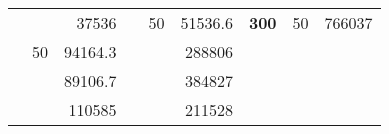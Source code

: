 \begin{table}[H]
\begin{tabular}{|ccrccrccc}
\rowcolor[HTML]{DDFDFF} 
\multicolumn{1}{|c|}{\cellcolor[HTML]{FFFFC7}}                                & \multicolumn{1}{c|}{\cellcolor[HTML]{DDFDFF}}                      & \multicolumn{1}{r|}{\cellcolor[HTML]{DAE8FC}37536}     & \multicolumn{1}{c|}{\cellcolor[HTML]{FFFFC7}}                                & \multicolumn{1}{c|}{\multirow{-10}{*}{\cellcolor[HTML]{DDFDFF}50}}  & \multicolumn{1}{r|}{\cellcolor[HTML]{DDFDFF}51536.6}   & \multicolumn{1}{c|}{\multirow{-19}{*}{\cellcolor[HTML]{FFFFC7}\textbf{300}}} & \multicolumn{1}{c|}{\multirow{-10}{*}{\cellcolor[HTML]{DDFDFF}50}} & \multicolumn{1}{r|}{\cellcolor[HTML]{DDFDFF}766037}    \\ \cline{3-3} \cline{5-9} 
\multicolumn{1}{|c|}{\cellcolor[HTML]{FFFFC7}}                                & \multicolumn{1}{c|}{\multirow{-10}{*}{\cellcolor[HTML]{DDFDFF}50}} & \multicolumn{1}{r|}{\cellcolor[HTML]{DDFDFF}94164.3}   & \multicolumn{1}{c|}{\cellcolor[HTML]{FFFFC7}}                                & \multicolumn{1}{c|}{\cellcolor[HTML]{DAE8FC}}                       & \multicolumn{1}{r|}{\cellcolor[HTML]{DAE8FC}288806}    &                                                                              &                                                                    &                                                        \\ \cline{2-3} \cline{6-6}
\multicolumn{1}{|c|}{\cellcolor[HTML]{FFFFC7}}                                & \multicolumn{1}{c|}{\cellcolor[HTML]{DAE8FC}}                      & \multicolumn{1}{r|}{\cellcolor[HTML]{DAE8FC}89106.7}   & \multicolumn{1}{c|}{\cellcolor[HTML]{FFFFC7}}                                & \multicolumn{1}{c|}{\cellcolor[HTML]{DAE8FC}}                       & \multicolumn{1}{r|}{\cellcolor[HTML]{DDFDFF}384827}    &                                                                              &                                                                    &                                                        \\ \cline{3-3} \cline{6-6}
\multicolumn{1}{|c|}{\cellcolor[HTML]{FFFFC7}}                                & \multicolumn{1}{c|}{\cellcolor[HTML]{DAE8FC}}                      & \multicolumn{1}{r|}{\cellcolor[HTML]{DDFDFF}110585}    & \multicolumn{1}{c|}{\cellcolor[HTML]{FFFFC7}}                                & \multicolumn{1}{c|}{\cellcolor[HTML]{DAE8FC}}                       & \multicolumn{1}{r|}{\cellcolor[HTML]{DAE8FC}211528}    &                                                                              &                                                                    &                                                        \\ \cline{3-3} \cline{6-6}

\end{tabular}
\end{table}
